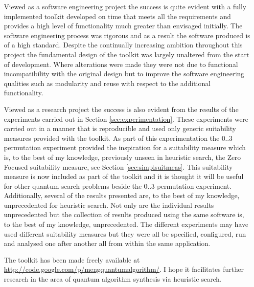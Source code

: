 Viewed as a software engineering project the success is quite evident with a fully implemented toolkit developed on time that meets all the requirements and provides a high level of functionality much greater than envisaged initially.
The software engineering process was rigorous and as a result the software produced is of a high standard.
Despite the continually increasing ambition throughout this project the fundamental design of the toolkit was largely unaltered from the start of development.
Where alterations were made they were not due to functional incompatibility with the original design but to improve the software engineering qualities such as modularity and reuse with respect to the additional functionality.

Viewed as a research project the success is also evident from the results of the experiments carried out in Section \ref{sec:experimentation}.
These experiments were carried out in a manner that is reproducible and used only generic suitability measures provided with the toolkit.
As part of this experimentation the $0..3$ permutation experiment provided the inspiration for a suitability measure which is, to the best of my knowledge,  previously unseen in heuristic search, the Zero Focused suitability measure, see Section \ref{sec:simplsuitmeas}.
This suitability measure is now included as part of the toolkit and it is thought it will be useful for other quantum search problems beside the $0..3$ permutation experiment.
Additionally, several of the results presented are, to the best of my knowledge, unprecedented for heuristic search.
Not only are the individual results unprecedented but the collection of results produced using the same software is, to the best of my knowledge, unprecedented.
The different experiments may have used different suitability measures but they were all be specified, configured, run and analysed one after another all from within the same application.

The toolkit has been made freely available at \url{http://code.google.com/p/mengquantumalgorithm/}.
I hope it facilitates further research in the area of quantum algorithm synthesis via heuristic search.
